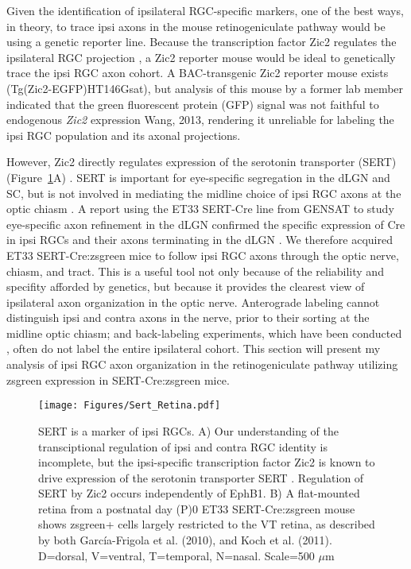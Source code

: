 Given the identification of ipsilateral RGC-specific markers, one of the best ways, in theory, to trace ipsi axons in the mouse retinogeniculate pathway would be using a genetic reporter line.
Because the transcription factor Zic2 regulates the ipsilateral RGC projection \cite{herrera2003zic2,williams2003ephrin}, a Zic2 reporter mouse would be ideal to genetically trace the ipsi RGC axon cohort.
A BAC-transgenic Zic2 reporter mouse exists (Tg(Zic2-EGFP)HT146Gsat), but analysis of this mouse by a former lab member indicated that the green fluorescent protein (GFP) signal was not faithful to endogenous \emph{Zic2} expression {Wang, 2013}, rendering it unreliable for labeling the ipsi RGC population and its axonal projections.

However, Zic2 directly regulates expression of the serotonin transporter (SERT) (Figure~\ref{Figures/Sert_Retina}A) \cite{garcia2010zic2}.
SERT is important for eye-specific segregation in the dLGN and SC, but is not involved in mediating the midline choice of ipsi RGC axons at the optic chiasm \cite{salichon2001excessive,upton1999excess,garcia2010zic2}.
A report using the ET33 SERT-Cre line from GENSAT to study eye-specific axon refinement in the dLGN confirmed the specific expression of Cre in ipsi RGCs and their axons terminating in the dLGN \cite{koch2011pathway}.
We therefore acquired ET33 SERT-Cre:zsgreen mice to follow ipsi RGC axons through the optic nerve, chiasm, and tract.
This is a useful tool not only because of the reliability and specifity afforded by genetics, but because it provides the clearest view of ipsilateral axon organization in the optic nerve.
Anterograde labeling cannot distinguish ipsi and contra axons in the nerve, prior to their sorting at the midline optic chiasm; and back-labeling experiments, which have been conducted \cite{colello1990early}, often do not label the entire ipsilateral cohort.
This section will present my analysis of ipsi RGC axon organization in the retinogeniculate pathway utilizing zsgreen expression in SERT-Cre:zsgreen mice.

\begin{figure}[hbtp]
    \begin{center}
        \texttt{[image: Figures/Sert\_Retina.pdf]}
        \caption[SERT is a marker of ipsi RGCs.]
        {
        SERT is a marker of ipsi RGCs.
        A) Our understanding of the transciptional regulation of ipsi and contra RGC identity is incomplete, but the ipsi-specific transcription factor Zic2 is known to drive expression of the serotonin transporter SERT \cite{garcia2010zic2}.
        Regulation of SERT by Zic2 occurs independently of EphB1.
        B) A flat-mounted retina from a postnatal day (P)0 ET33 SERT-Cre:zsgreen mouse shows zsgreen+ cells largely restricted to the VT retina, as described by both Garc\'ia-Frigola et al. (2010), and Koch et al. (2011).
        D=dorsal, V=ventral, T=temporal, N=nasal.
        Scale=500 $\mu$m
        }
        \label{Figures/Sert_Retina}
    \end{center}
\end{figure}

